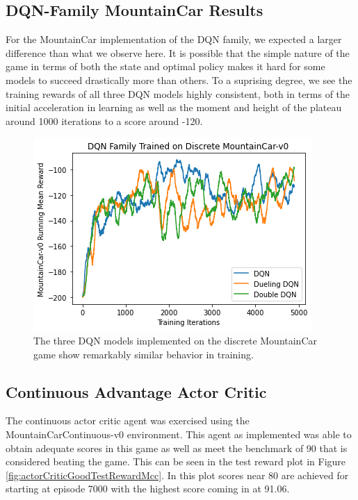 \documentclass[conference]{IEEEtran}
\begin{document}
\subsection{DQN-Family MountainCar Results}
For the MountainCar implementation of the DQN family, we expected a larger difference than what we observe here. It is possible that the simple nature of the game in terms of both the state and optimal policy makes it hard for some models to succeed drastically more than others. To a suprising degree, we see the training rewards of all three DQN models highly consistent, both in terms of the initial acceleration in learning as well as the moment and height of the plateau around 1000 iterations to a score around -120.

\begin{figure}
\centerline{\includegraphics[scale=0.6]{DQN_family_car.png}}
\caption{The three DQN models implemented on the discrete MountainCar game show remarkably similar behavior in training.}
\end{figure}

\subsection{Continuous Advantage Actor Critic}
The continuous actor critic agent was exercised using the MountainCarContinuous-v0 environment.
This agent as implemented was able to obtain adequate scores in this game as well as meet the benchmark of 90 that is considered beating the game.
This can be seen in the test reward plot in Figure \ref{fig:actorCriticGoodTestRewardMcc}.
In this plot scores near 80 are achieved for starting at episode 7000 with the highest score coming in at 91.06.
\end{document}
